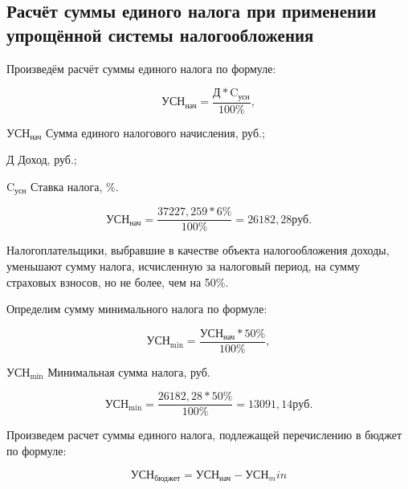 \tocless\subsection{Расчёт суммы единого налога при применении упрощённой системы налогообложения}

Произведём расчёт суммы единого налога по формуле:

\begin{equation}
    \text{УСН}_\text{нач} = \frac{\text{Д} * \text{C}_\text{усн}}{100\%},
\end{equation}

\begin{eqexpl}[7ex]
    \item{$\text{УСН}_\text{нач}$} Сумма единого налогового начисления, руб.;
    \item{Д} Доход, руб.;
    \item{$\text{C}_\text{усн}$} Ставка налога, \%.
\end{eqexpl}

\begin{equation*}
    \text{УСН}_\text{нач} = \frac{37227,259 * 6\%}{100\%} = 26182,28 \text{руб}.
\end{equation*}

Налогоплательщики, выбравшие в качестве объекта налогообложения
доходы, уменьшают сумму налога, исчисленную за налоговый период, на
сумму страховых взносов, но не более, чем на 50\%.

Определим сумму минимального налога по формуле:

\begin{equation}
    \text{УСН}_\text{min} = \frac{\text{УСН}_\text{нач} * 50\%}{100\%},
\end{equation}

\begin{eqexpl}[7ex]
    \item{$\text{УСН}_\text{min}$} Минимальная сумма налога, руб.
\end{eqexpl}

\begin{equation*}
    \text{УСН}_\text{min} = \frac{26182,28 * 50\%}{100\%} = 13091,14 руб.
\end{equation*}

Произведем расчет суммы единого налога, подлежащей перечислению
в бюджет по формуле:

\begin{equation}
    \text{УСН}_\text{бюджет} = \text{УСН}_\text{нач} - \text{УСН}_min
\end{equation}

